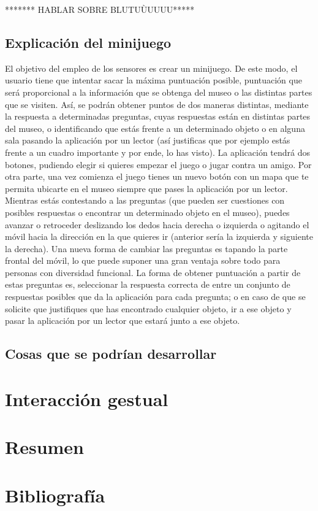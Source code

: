 ******* HABLAR SOBRE BLUTUÙUUUU*****

\subsection*{Explicación del minijuego}

El objetivo del empleo de los sensores es crear un minijuego. De este modo, el usuario tiene que intentar sacar la máxima puntuación posible, puntuación que será proporcional a la información que se obtenga del museo o las distintas partes que se visiten. Así, se podrán obtener puntos de dos maneras distintas, mediante la respuesta a determinadas preguntas, cuyas respuestas están en distintas partes del museo, o identificando que estás frente a un determinado objeto o en alguna sala pasando la aplicación por un lector (así justificas que por ejemplo estás frente a un cuadro importante y por ende, lo has visto). La aplicación tendrá dos botones, pudiendo elegir si quieres empezar el juego o jugar contra un amigo. Por otra parte, una vez comienza el juego tienes un nuevo botón con un mapa que te permita ubicarte en el museo siempre que pases la aplicación por un lector. Mientras estás contestando a las preguntas (que pueden ser cuestiones con posibles respuestas o encontrar un determinado objeto en el museo), puedes avanzar o retroceder deslizando los dedos hacia derecha o izquierda o agitando el móvil hacia la dirección en la que quieres ir (anterior sería la izquierda y siguiente la derecha). Una nueva forma de cambiar las preguntas es tapando la parte frontal del móvil, lo que puede suponer una gran ventaja sobre todo para personas con diversidad funcional. La forma de obtener puntuación a partir de estas preguntas es, seleccionar la respuesta correcta de entre un conjunto de respuestas posibles que da la aplicación para cada pregunta; o en caso de que se solicite que justifiques que has encontrado cualquier objeto, ir a ese objeto y pasar la aplicación por un lector que estará junto a ese objeto.

\subsection*{Cosas que se podrían desarrollar}




\section{Interacción gestual}



\section{Resumen}

\section{Bibliografía}

